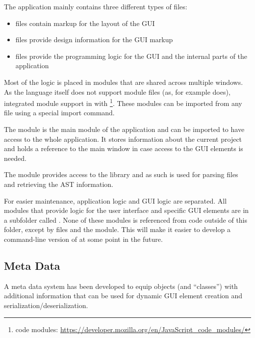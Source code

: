 The application mainly contains three different types of files:

\begin{itemize}\addtolength{\itemsep}{-0.5\baselineskip}
\item {} files contain markup for the layout of the GUI
\item {} files provide design information for the GUI markup
\item {} files provide the programming logic for the GUI and the internal parts of the application
\end{itemize}

Most of the  logic is placed in modules that are shared across multiple windows. As the  language itself does not support module files (as, for example  does),  integrated module support in  with \footnote{ code modules: \url{https://developer.mozilla.org/en/JavaScript_code_modules/}}. These modules can be imported from any  file using a special import command.

The  module is the main module of the application and can be imported to have access to the whole application. It stores information about the current project and holds a reference to the main window in case access to the GUI elements is needed.

The  module provides access to the  library and as such is used for parsing  files and retrieving the AST information.

For easier maintenance, application logic and GUI logic are separated. All modules that provide logic for the user interface and specific GUI elements are in a subfolder called . None of these modules is referenced from code outside of this folder, except by  files and the  module. This will make it easier to develop a command-line version of  at some point in the future.

\subsection{Meta Data}
\label{sec:MetaData}

A meta data system has been developed to equip  objects (and ``classes'') with additional information that can be used for dynamic GUI element creation and serialization/deserialization.

